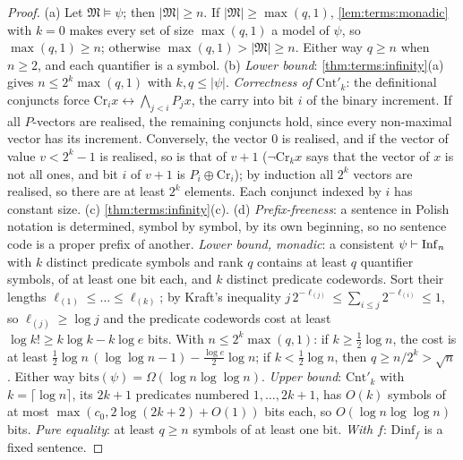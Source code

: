 \begin{proof}
(a) Let $\mathfrak M\models\psi$; then $\lvert\mathfrak M\rvert\ge n$. If $\lvert\mathfrak M\rvert\ge\max(q,1)$, \cref{lem:terms:monadic} with $k=0$ makes every set of size $\max(q,1)$ a model of $\psi$, so $\max(q,1)\ge n$; otherwise $\max(q,1)>\lvert\mathfrak M\rvert\ge n$. Either way $q\ge n$ when $n\ge2$, and each quantifier is a symbol. (b) \emph{Lower bound}: \cref{thm:terms:infinity}(a) gives $n\le2^k\max(q,1)$ with $k,q\le\lvert\psi\rvert$. \emph{Correctness of $\mathrm{Cnt}'_k$}: the definitional conjuncts force $\mathrm{Cr}_ix\leftrightarrow\bigwedge_{j<i}P_jx$, the carry into bit $i$ of the binary increment. If all $P$-vectors are realised, the remaining conjuncts hold, since every non-maximal vector has its increment. Conversely, the vector $0$ is realised, and if the vector of value $v<2^k-1$ is realised, so is that of $v+1$ ($\neg\mathrm{Cr}_kx$ says that the vector of $x$ is not all ones, and bit $i$ of $v+1$ is $P_i\oplus\mathrm{Cr}_i$); by induction all $2^k$ vectors are realised, so there are at least $2^k$ elements. Each conjunct indexed by $i$ has constant size. (c) \cref{thm:terms:infinity}(c). (d) \emph{Prefix-freeness}: a sentence in Polish notation is determined, symbol by symbol, by its own beginning, so no sentence code is a proper prefix of another. \emph{Lower bound, monadic}: a consistent $\psi\vdash\mathrm{Inf}_{n}$ with $k$ distinct predicate symbols and rank $q$ contains at least $q$ quantifier symbols, of at least one bit each, and $k$ distinct predicate codewords. Sort their lengths $\ell_{(1)}\le\dots\le\ell_{(k)}$; by Kraft's inequality $j\,2^{-\ell_{(j)}}\le\sum_{i\le j}2^{-\ell_{(i)}}\le1$, so $\ell_{(j)}\ge\log j$ and the predicate codewords cost at least $\log k!\ge k\log k-k\log e$ bits. With $n\le2^k\max(q,1)$: if $k\ge\frac12\log n$, the cost is at least $\frac12\log n\,(\log\log n-1)-\frac{\log e}2\log n$; if $k<\frac12\log n$, then $q\ge n/2^k>\sqrt n$. Either way $\mathrm{bits}(\psi)=\Omega(\log n\log\log n)$. \emph{Upper bound}: $\mathrm{Cnt}'_k$ with $k=\lceil\log n\rceil$, its $2k+1$ predicates numbered $1,\dots,2k+1$, has $O(k)$ symbols of at most $\max(c_0,2\log(2k+2)+O(1))$ bits each, so $O(\log n\log\log n)$ bits. \emph{Pure equality}: at least $q\ge n$ symbols of at least one bit. \emph{With $f$}: $\mathrm{Dinf}_f$ is a fixed sentence.
\end{proof}

